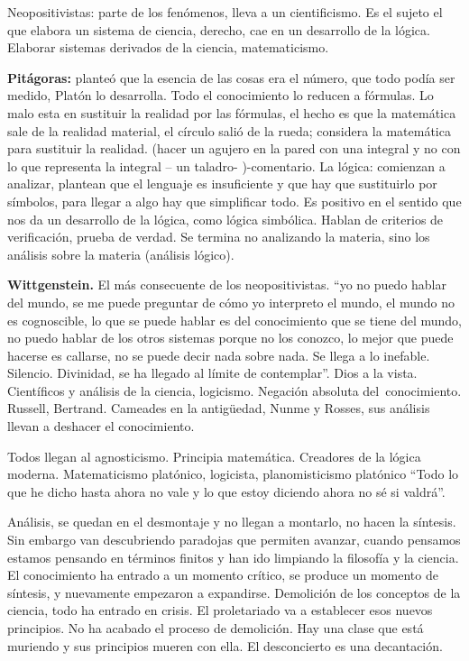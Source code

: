 \documentclass[
  a4paper,
]{article}
\begin{document}
Neopositivistas: parte de los fenómenos, lleva a un cientificismo. Es el
sujeto el que elabora un sistema de ciencia, derecho, cae en un
desarrollo de la lógica. Elaborar sistemas derivados de la ciencia,
matematicismo.

\textbf{Pitágoras:} planteó que la esencia de las cosas era el número,
que todo podía ser medido, Platón lo desarrolla. Todo el conocimiento lo
reducen a fórmulas. Lo malo esta en sustituir la realidad por las
fórmulas, el hecho es que la matemática sale de la realidad material, el
círculo salió de la rueda; considera la matemática para sustituir la
realidad. (hacer un agujero en la pared con una integral y no con lo que
representa la integral -- un taladro- )-comentario. La lógica: comienzan
a analizar, plantean que el lenguaje es insuficiente y que hay que
sustituirlo por símbolos, para llegar a algo hay que simplificar todo.
Es positivo en el sentido que nos da un desarrollo de la lógica, como
lógica simbólica. Hablan de criterios de verificación, prueba de verdad.
Se termina no analizando la materia, sino los análisis sobre la materia
(análisis lógico).

\textbf{Wittgenstein.} El más consecuente de los neopositivistas. ``yo
no puedo hablar del mundo, se me puede preguntar de cómo yo interpreto
el mundo, el mundo no es cognoscible, lo que se puede hablar es del
conocimiento que se tiene del mundo, no puedo hablar de los otros
sistemas porque no los conozco, lo mejor que puede hacerse es callarse,
no se puede decir nada sobre nada. Se llega a lo inefable. Silencio.
Divinidad, se ha llegado al límite de contemplar''. Dios a la vista.
Científicos y análisis de la ciencia, logicismo. Negación absoluta
del~conocimiento. Russell, Bertrand. Cameades en la antigüedad, Nunme y
Rosses, sus análisis llevan a deshacer el conocimiento.

Todos llegan al agnosticismo. Principia matemática. Creadores de la
lógica moderna. Matematicismo platónico, logicista, planomisticismo
platónico ``Todo lo que he dicho hasta ahora no vale y lo que estoy
diciendo ahora no sé si valdrá''.

Análisis, se quedan en el desmontaje y no llegan a montarlo, no hacen la
síntesis. Sin embargo van descubriendo paradojas que permiten avanzar,
cuando pensamos estamos pensando en términos finitos y han ido limpiando
la filosofía y la ciencia. El conocimiento ha entrado a un momento
crítico, se produce un momento de síntesis, y nuevamente empezaron a
expandirse. Demolición de los conceptos de la ciencia, todo ha entrado
en crisis. El proletariado va a establecer esos nuevos principios. No ha
acabado el proceso de demolición. Hay una clase que está muriendo y sus
principios mueren con ella. El desconcierto es una decantación.
\end{document}
